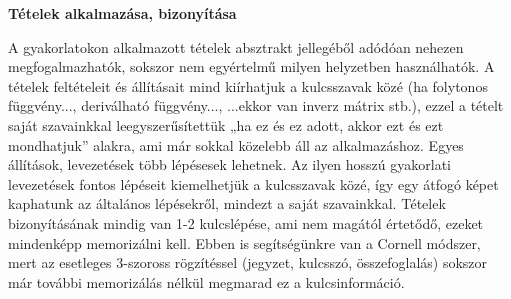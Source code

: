 \documentclass[../Main.tex]{subfiles}
\begin{document}
\textbf{Tételek alkalmazása, bizonyítása}


A gyakorlatokon alkalmazott tételek absztrakt jellegéből adódóan nehezen
megfogalmazhatók, sokszor nem egyértelmű milyen helyzetben használhatók. A tételek
feltételeit és állításait mind kiírhatjuk a kulcsszavak közé (ha folytonos függvény...,
deriválható függvény..., ...ekkor van inverz mátrix stb.), ezzel a tételt saját szavainkkal
leegyszerűsítettük „ha ez és ez adott, akkor ezt és ezt mondhatjuk” alakra, ami már sokkal
közelebb áll az alkalmazáshoz. Egyes állítások, levezetések több lépésesek lehetnek. Az
ilyen hosszú gyakorlati levezetések fontos lépéseit kiemelhetjük a kulcsszavak közé, így
egy átfogó képet kaphatunk az általános lépésekről, mindezt a saját szavainkkal.
Tételek bizonyításának mindig van 1-2 kulcslépése, ami nem magától értetődő, ezeket
mindenképp memorizálni kell. Ebben is segítségünkre van a Cornell módszer, mert az
esetleges 3-szoross rögzítéssel (jegyzet, kulcsszó, összefoglalás) sokszor már további
memorizálás nélkül megmarad ez a kulcsinformáció.
\end{document}
